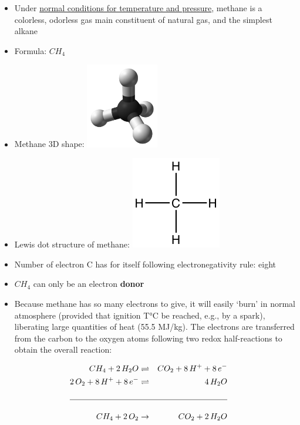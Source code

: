 \documentclass[]{book}
\providecommand{\tightlist}{%
  \setlength{\itemsep}{0pt}\setlength{\parskip}{0pt}}
\theoremstyle{definition}
\theoremstyle{definition}
\theoremstyle{definition}
\theoremstyle{remark}
\begin{document}
\begin{itemize}
\tightlist
\item
  Under
  \href{https://en.wikipedia.org/wiki/Standard_conditions_for_temperature_and_pressure}{normal
  conditions for temperature and pressure}, methane is a colorless,
  odorless gas main constituent of natural gas, and the simplest alkane
\item
  Formula: \(CH_4\)
\item
  Methane 3D shape:
  \includegraphics[width=0.25000\textwidth]{pictures/Methane-CRC-MW-3D-balls.png}
\item
  Lewis dot structure of methane:
  \includegraphics{pictures/methane_lewis_structure.png}
\item
  Number of electron C has for itself following electronegativity rule:
  eight
\item
  \(CH_4\) can only be an electron \textbf{donor}
\item
  Because methane has so many electrons to give, it will easily `burn'
  in normal atmosphere (provided that ignition T°C be reached, e.g., by
  a spark), liberating large quantities of heat (55.5 MJ/kg). The
  electrons are transferred from the carbon to the oxygen atoms
  following two redox half-reactions to obtain the overall reaction:
\end{itemize}

\begin{align}
CH_4 + 2\,H_2O & \rightleftharpoons & CO_2 + 8\,H^+ + 8\,e^-\\
2\,O_2 + 8\,H^+ + 8\,e^- & \rightleftharpoons & 4\,H_2O\\
& &\\
\hline\\
CH_4 + 2\,O_2 & \to & CO_2 + 2\,H_2O
\end{align}
\end{document}
